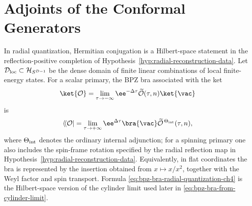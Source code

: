 \section{Adjoints of the Conformal Generators}

In radial quantization, Hermitian conjugation is a Hilbert-space statement in
the reflection-positive completion of
Hypothesis~\ref{hyp:radial-reconstruction-data}.  Let
\(\mathcal D_{\rm loc}\subset\mathcal H_{S^{D-1}}\) be the dense domain of
finite linear combinations of local finite-energy states.  For a scalar
primary, the BPZ bra associated with the ket
\[
  \ket{\mathcal O}
  =
  \lim_{\tau\to-\infty}
  \ee^{-\Delta\tau}\widetilde{\mathcal O}(\tau,n)\ket{\vac}
\]
is
\begin{equation}
  \langle\!\langle\mathcal O|
  =
  \lim_{\tau\to+\infty}
  \ee^{\Delta\tau}
  \bra{\vac}\widetilde{\mathcal O}^{\,\Theta_{\rm int}}(\tau,n),
  \label{eq:bpz-bra-radial-quantization-ch4}
\end{equation}
where \(\Theta_{\rm int}\) denotes the ordinary internal adjunction; for a
spinning primary one also includes the spin-frame rotation specified by the
radial reflection map in Hypothesis~\ref{hyp:radial-reconstruction-data}.
Equivalently, in flat coordinates the bra is represented by the insertion
obtained from \(x\mapsto x/x^2\), together with the Weyl factor and spin
transport.  Formula \eqref{eq:bpz-bra-radial-quantization-ch4} is the
Hilbert-space version of the cylinder limit used later in
\eqref{eq:bpz-bra-from-cylinder-limit}.

